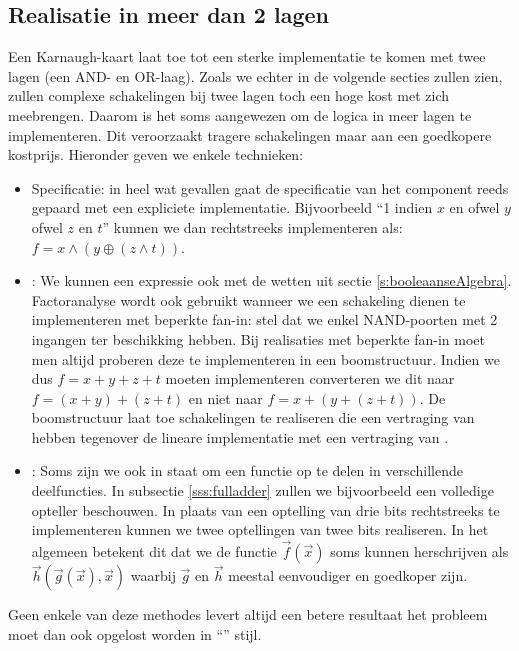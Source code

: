\subsection{Realisatie in meer dan 2 lagen}
Een Karnaugh-kaart laat toe tot een sterke implementatie te komen met twee lagen (een AND- en OR-laag). Zoals we echter in de volgende secties zullen zien, zullen complexe schakelingen bij twee lagen toch een hoge kost met zich meebrengen. Daarom is het soms aangewezen om de logica in meer lagen te implementeren. Dit veroorzaakt tragere schakelingen maar aan een goedkopere kostprijs. Hieronder geven we enkele technieken:
\begin{itemize}
 \item Specificatie: in heel wat gevallen gaat de specificatie van het component reeds gepaard met een expliciete implementatie. Bijvoorbeeld ``1 indien $x$ en ofwel $y$ ofwel $z$ en $t$'' kunnen we dan rechtstreeks implementeren als: $f=x\wedge\left(y\oplus\left(z\wedge t\right)\right)$.
 \item {}: We kunnen een expressie ook  met de wetten uit sectie \ref{s:booleaanseAlgebra}. Factoranalyse wordt ook gebruikt wanneer we een schakeling dienen te implementeren met beperkte fan-in: stel dat we enkel NAND-poorten met 2 ingangen ter beschikking hebben. Bij realisaties met beperkte fan-in moet men altijd proberen deze te implementeren in een boomstructuur. Indien we dus $f=x+y+z+t$ moeten implementeren converteren we dit naar $f=\left(x+y\right)+\left(z+t\right)$ en niet naar $f=x+\left(y+\left(z+t\right)\right)$. De boomstructuur laat toe schakelingen te realiseren die een vertraging van  hebben tegenover de lineare implementatie met een vertraging van .
 \item {}: Soms zijn we ook in staat om een functie op te delen in verschillende deelfuncties. In subsectie \ref{sss:fulladder} zullen we bijvoorbeeld een volledige opteller beschouwen. In plaats van een optelling van drie bits rechtstreeks te implementeren kunnen we twee optellingen van twee bits realiseren. In het algemeen betekent dit dat we de functie $\vec{f}\left(\vec{x}\right)$ soms kunnen herschrijven als $\vec{h}\left(\vec{g}\left(\vec{x}\right),\vec{x}\right)$ waarbij $\vec{g}$ en $\vec{h}$ meestal eenvoudiger en goedkoper zijn.
\end{itemize}
Geen enkele van deze methodes levert altijd een betere resultaat het probleem moet dan ook opgelost worden in ``'' stijl.
